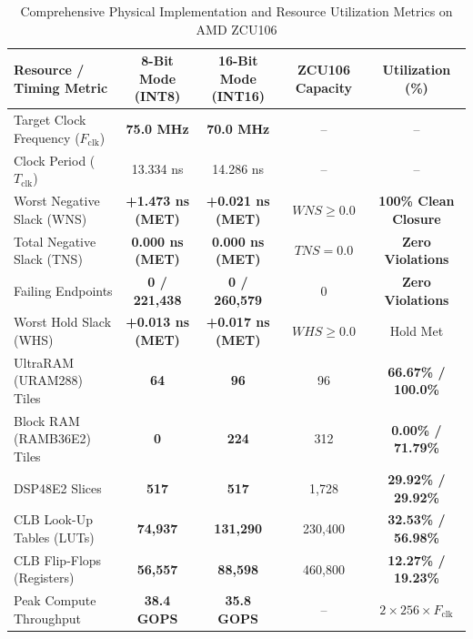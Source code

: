 \documentclass[10pt,journal,compsoc]{IEEEtran}
\begin{document}
\begin{table}[t]
\caption{Comprehensive Physical Implementation and Resource Utilization Metrics on AMD ZCU106}
\label{tab:utilization}
\centering
\begin{tabular}{lcccc}
\toprule
\textbf{Resource / Timing Metric} & \textbf{8-Bit Mode (INT8)} & \textbf{16-Bit Mode (INT16)} & \textbf{ZCU106 Capacity} & \textbf{Utilization (\%)} \\
\midrule
Target Clock Frequency ($F_{\text{clk}}$) & \textbf{75.0 MHz} & \textbf{70.0 MHz} & -- & -- \\
Clock Period ($T_{\text{clk}}$) & 13.334 ns & 14.286 ns & -- & -- \\
Worst Negative Slack (WNS) & \textbf{+1.473 ns (MET)} & \textbf{+0.021 ns (MET)} & $WNS \ge 0.0$ & \textbf{100\% Clean Closure} \\
Total Negative Slack (TNS) & \textbf{0.000 ns (MET)} & \textbf{0.000 ns (MET)} & $TNS = 0.0$ & \textbf{Zero Violations} \\
Failing Endpoints & \textbf{0 / 221,438} & \textbf{0 / 260,579} & 0 & \textbf{Zero Violations} \\
Worst Hold Slack (WHS) & \textbf{+0.013 ns (MET)} & \textbf{+0.017 ns (MET)} & $WHS \ge 0.0$ & Hold Met \\
UltraRAM (URAM288) Tiles & \textbf{64} & \textbf{96} & 96 & \textbf{66.67\% / 100.0\%} \\
Block RAM (RAMB36E2) Tiles & \textbf{0} & \textbf{224} & 312 & \textbf{0.00\% / 71.79\%} \\
DSP48E2 Slices & \textbf{517} & \textbf{517} & 1,728 & \textbf{29.92\% / 29.92\%} \\
CLB Look-Up Tables (LUTs) & \textbf{74,937} & \textbf{131,290} & 230,400 & \textbf{32.53\% / 56.98\%} \\
CLB Flip-Flops (Registers) & \textbf{56,557} & \textbf{88,598} & 460,800 & \textbf{12.27\% / 19.23\%} \\
Peak Compute Throughput & \textbf{38.4 GOPS} & \textbf{35.8 GOPS} & -- & $2 \times 256 \times F_{\text{clk}}$ \\
\bottomrule
\end{tabular}
\end{table}
\end{document}
